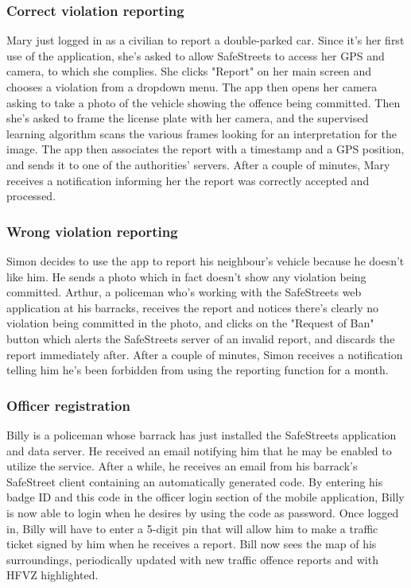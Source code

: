 \documentclass[12pt,a4paper]{article}
\begin{document}
\subsubsection{Correct violation reporting}
Mary just logged in as a civilian to report a double-parked car. Since it's her first use of the application, she's asked to allow SafeStreets to access her GPS and camera, to which she complies. She clicks "Report" on her main screen and chooses a violation from a dropdown menu. The app then opens her camera asking to take a photo of the vehicle showing the offence being committed. Then she's asked to frame the license plate with her camera, and the supervised learning algorithm scans the various frames looking for an interpretation for the image. The app then associates the report with a timestamp and a GPS position, and sends it to one of the authorities' servers. After a couple of minutes, Mary receives a notification informing her the report was correctly accepted and processed.

\subsubsection{Wrong violation reporting}
Simon decides to use the app to report his neighbour's vehicle because he doesn't like him. He sends a photo which in fact doesn't show any violation being committed. Arthur, a policeman who's working with the SafeStreets web application at his barracks, receives the report and notices there's clearly no violation being committed in the photo, and clicks on the "Request of Ban" button which alerts the SafeStreets server of an invalid report, and discards the report immediately after. After a couple of minutes, Simon receives a notification telling him he's been forbidden from using the reporting function for a month.

\subsubsection{Officer registration}
Billy is a policeman whose barrack has just installed the SafeStreets application and data server. He received an email notifying him that he may be enabled to utilize the service. After a while, he receives an email from his barrack's SafeStreet client containing an automatically generated code. By entering his badge ID and this code in the officer login section of the mobile application, Billy is now able to login when he desires by using the code as password. Once logged in, Billy will have to enter a 5-digit pin that will allow him to make a traffic ticket signed by him when he receives a report.
Bill now sees the map of his surroundings, periodically updated with new traffic offence reports and with HFVZ highlighted. 
\end{document}
